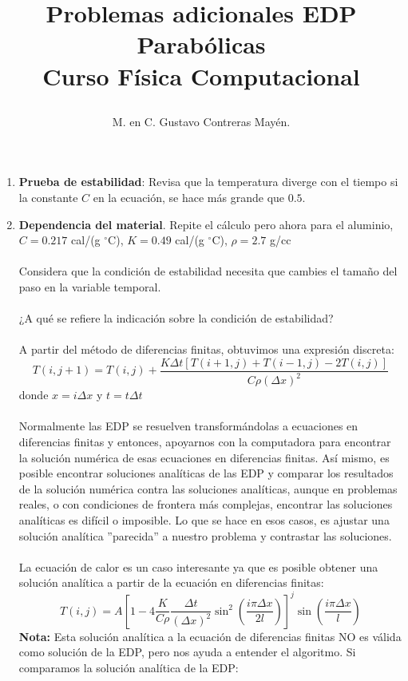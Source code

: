 \documentclass[12pt]{article}
\author{M. en C. Gustavo Contreras Mayén.}
\title{\begin{center}
Problemas adicionales EDP Parabólicas \\ Curso Física Computacional
\end{center}}
\date{ }
\begin{document}
\maketitle
\fontsize{13}{13}\selectfont
\begin{enumerate}
\item \textbf{Prueba de estabilidad}: Revisa que la temperatura diverge con el tiempo si la constante $C$ en la ecuaci\'{o}n, se hace m\'{a}s grande que $0.5$.
\item \textbf{Dependencia del material}. Repite el c\'{a}lculo pero ahora para el aluminio, $C=0.217$ cal/(g ${}^{\circ}$C), $K=0.49$ cal/(g ${}^{\circ}$C), $\rho = 2.7$ g/cc 
\\ 
\\
Considera que la condici\'{o}n de estabilidad necesita que cambies el tamaño del paso en la variable temporal.
\\
\\
¿A qué se refiere la indicaci\'{o}n sobre la condici\'{o}n de estabilidad?
\\
\\
A partir del m\'{e}todo de diferencias finitas, obtuvimos una expresi\'{o}n discreta:
\[ T(i,j+1)=T(i,j) + \dfrac{K \Delta t [T(i+1,j) + T(i-1,j) - 2T(i,j)]}{C \rho (\Delta x)^{2}} \]
donde $x = i \Delta x$ y $ t= t \Delta t$
\\
\\
Normalmente las EDP se resuelven transform\'{a}ndolas a ecuaciones en diferencias finitas y entonces, apoyarnos con la computadora para encontrar la soluci\'{o}n num\'{e}rica de esas ecuaciones en diferencias finitas. As\'{i} mismo, es posible encontrar soluciones anal\'{i}ticas de las EDP y comparar los resultados de la soluci\'{o}n num\'{e}rica contra las soluciones anal\'{i}ticas, aunque en problemas reales, o con condiciones de frontera m\'{a}s complejas, encontrar las soluciones anal\'{i}ticas es dif\'{i}cil o imposible. Lo que se hace en esos casos, es ajustar una solución anal\'{i}tica ''parecida'' a nuestro problema y contrastar las soluciones.
\\
\\
La ecuaci\'{o}n de calor es un caso interesante ya que es posible obtener una solución anal\'{i}tica a partir de la ecuaci\'{o}n en diferencias finitas:
\[  T(i,j) = A \left[  1 - 4 \dfrac{K}{C \rho} \dfrac{\Delta t}{(\Delta x)^{2}}  \sin^{2} \left( \dfrac{i \pi \Delta x}{2l} \right) \right]^{j} \sin \left( \dfrac{i \pi \Delta x}{l} \right) \]
\textbf{Nota: } Esta solución anal\'{i}tica a la ecuaci\'{o}n de diferencias finitas NO es v\'{a}lida como soluci\'{o}n de la EDP, pero nos ayuda a entender el algoritmo. Si comparamos la soluci\'{o}n anal\'{i}tica de la EDP:

\end{enumerate}
\end{document}
